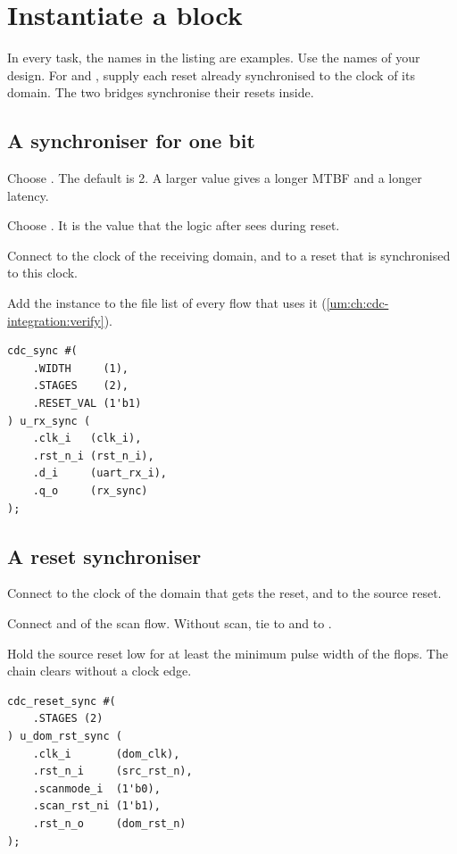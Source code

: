 \section{Instantiate a block}\label{um:ch:cdc-integration:instantiate}
In every task, the names in the listing are examples. Use the names of your design. For  and , supply each reset already synchronised to the clock of its domain. The two bridges synchronise their resets inside.

\subsection{A synchroniser for one bit}
\begin{procedure}
  \item Choose . The default is 2. A larger value gives a longer MTBF and a longer latency.
  \item Choose . It is the value that the logic after  sees during reset.
  \item Connect  to the clock of the receiving domain, and  to a reset that is synchronised to this clock.
  \item Add the instance to the file list of every flow that uses it (\cref{um:ch:cdc-integration:verify}).
\end{procedure}
\begin{lstlisting}
cdc_sync #(
    .WIDTH     (1),
    .STAGES    (2),
    .RESET_VAL (1'b1)
) u_rx_sync (
    .clk_i   (clk_i),
    .rst_n_i (rst_n_i),
    .d_i     (uart_rx_i),
    .q_o     (rx_sync)
);
\end{lstlisting}

\subsection{A reset synchroniser}
\begin{procedure}
  \item Connect  to the clock of the domain that gets the reset, and  to the source reset.
  \item Connect  and  of the scan flow. Without scan, tie  to  and  to .
  \item Hold the source reset low for at least the minimum pulse width of the flops. The chain clears without a clock edge.
\end{procedure}
\begin{lstlisting}
cdc_reset_sync #(
    .STAGES (2)
) u_dom_rst_sync (
    .clk_i       (dom_clk),
    .rst_n_i     (src_rst_n),
    .scanmode_i  (1'b0),
    .scan_rst_ni (1'b1),
    .rst_n_o     (dom_rst_n)
);
\end{lstlisting}

